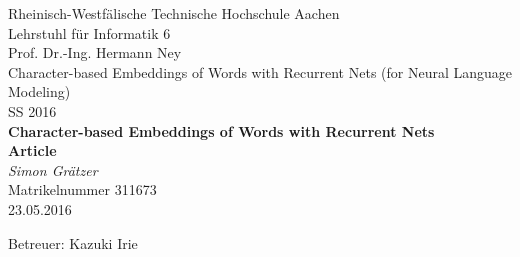 \documentclass[twoside,11pt,a4paper]{article}
\theoremstyle{break}
\begin{document}


%
%
%
%
\pagestyle{empty}

\begin{center}

    Rheinisch-Westf\"alische Technische Hochschule Aachen \\
    Lehrstuhl f\"ur Informatik 6 \\
    Prof. Dr.-Ing. Hermann Ney\\[6ex]
    Character-based Embeddings of Words with Recurrent Nets (for Neural Language Modeling)\\[12ex]  %
    SS 2016\\[6ex]
   
    \LARGE
    \textbf{Character-based Embeddings of Words with Recurrent Nets} \\[6ex]
    \textbf{Article} \\[6ex] %
    \textit{Simon Gr\"atzer} \\[6ex]
    \Large
    Matrikelnummer 311673 \\[6ex]
    23.05.2016

    \vfill
    \Large Betreuer: Kazuki Irie
	    
\end{center}
\end{document}
